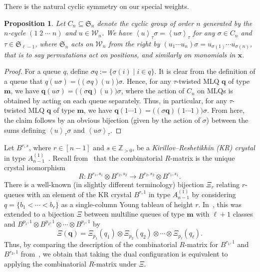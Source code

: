 \documentclass[reqno]{amsart}
\newcommand{\0}{\phantom{c}}
\newcommand{\swt}[1]{\left\langle #1 \right\rangle} %
\newcommand{\SymGp}[1]{\mathfrak{S}_{#1}} %
\newcommand{\mm}{\mathbf{m}}
\newcommand{\qq}{\mathbf{q}}
\newcommand{\xx}{\mathbf{x}}
\newcommand{\mcW}{\mathcal{W}}
\newcommand{\ZZ}{\mathbb{Z}}
\newcommand{\defn}[1]{{\color{darkred}\emph{#1}}} %
\theoremstyle{plain}
\newtheorem{prop}[thm]{Proposition}
\theoremstyle{definition}
\numberwithin{equation}{section}
\begin{document}
There is the natural cyclic symmetry on our special weights.

\begin{prop}
  Let $C_n \subseteq \SymGp{n}$ denote the cyclic group of order $n$ generated by the $n$-cycle $(1 \; 2 \; \dotsm \; n)$ and $u \in \mcW_n$.
  We have $\swt{u}_{\tau}\sigma = \swt{u \sigma}_{\tau}$ for any $\sigma \in C_n$ and $\tau \in \SymGp{\ell-1}$, where $\SymGp{n}$ acts on $\mcW_n$ from the right by $(u_1 \dotsm u_n) \sigma = u_{\sigma(1)} \dotsm u_{\sigma(n)}$, that is to say permutations act on positions, and similarly on monomials in $\xx$.
\end{prop}

\begin{proof}
  For a queue $q$, define $\sigma q := \{ \sigma(i) \mid i \in q\}$.
  It is clear from the definition of a queue that $q(u \sigma) = \bigl( (\sigma q)(u) \bigr) \sigma$.
  Hence, for any $\tau$-twisted MLQ $\qq$ of type $\mm$, we have
  $\qq (u \sigma) = \bigl( (\sigma \qq)(u) \bigr) \sigma$,
  where the action of $C_n$ on MLQs is obtained by acting on each queue separately.
  Thus, in particular, for any $\tau$-twisted MLQ $\qq$ of type $\mm$, we have
  $\qq (1 \cdots 1) = \bigl( (\sigma \qq)(1 \cdots 1) \bigr) \sigma$.
  From here, the claim follows by an obvious bijection
  (given by the action of $\sigma$) between the sums defining
  $\swt{u}_{\tau} \sigma$ and $\swt{u \sigma}_{\tau}$.
\end{proof}

Let $B^{r,s}$, where $r \in [n-1]$ and $s \in \ZZ_{>0}$, be a \defn{Kirillov--Reshetikhin (KR) crystal} in type $A_{n-1}^{(1)}$~\cite{KKMMNN92}.
Recall from~\cite{NY97,Shimozono02} that the combinatorial $R$-matrix is the unique crystal isomorphism
\[
R \colon B^{r_1,s_1} \otimes B^{r_2,s_2} \to B^{r_2,s_2} \otimes B^{r_1,s_1}.
\]
There is a well-known (in slightly different terminology) bijection $\Xi_r$ relating $r$-queues with an element of the KR crystal $B^{r,1}$ in type $A_{n-1}^{(1)}$ by considering $q = \{b_1 < \cdots < b_r\}$  as a single-column Young tableau of height $r$.
In~\cite{KMO15}, this was extended to a bijection $\Xi$ between multiline queues of type $\mm$ with $\ell+1$ classes and $B^{p_1,1} \otimes B^{p_2,1} \otimes \dotsm \otimes B^{p_{\ell},1}$ by
\[
\Xi(\qq) = \Xi_{p_1}(q_1) \otimes \Xi_{p_2}(q_2) \otimes \dotsm \otimes \Xi_{p_{\ell}}(q_{\ell}).
\]
Thus, by comparing the description of the combinatorial $R$-matrix for $B^{r_1,1}$ and $B^{r_2,1}$ from~\cite{NY97}, we obtain that taking the dual configuration is equivalent to applying the combinatorial $R$-matrix under $\Xi$.
\end{document}
